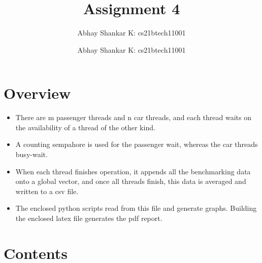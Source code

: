 \documentclass{amsart}
\author{Abhay Shankar K: cs21btech11001}
\newcommand{\me}{
    \author{Abhay Shankar K: cs21btech11001}
    \maketitle
}
\begin{document}
\title{Assignment 4}
\me

\section{Overview}
\begin{itemize}
    \item There are m passenger threads and n car threads, and each thread waits on the availability of a thread of the other kind.
    \item A counting sempahore is used for the passenger wait, whereas the car threads busy-wait.
    \item When each thread finishes operation, it appends all the benchmarking data onto a global vector, 
    and once all threads finish, this data is averaged and written to a csv file.
    \item The enclosed python scripts read from this file and generate graphs. Building the enclosed latex file generates the pdf report.
\end{itemize}

\section{Contents}
\end{document}

